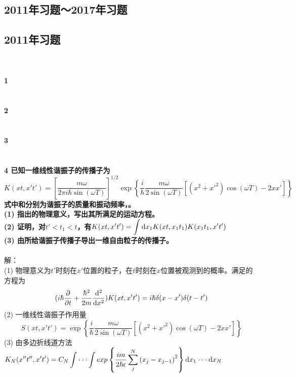 \documentclass[12pt]{article}
\numberwithin{equation}{section}	 %
\begin{document}
\begin{spacing}{1.5}
\newpage
\section{2011年习题～2017年习题}
\subsection{2011年习题}
~\\
~\\
\textbf{1 \quad }\\
~\\
~\\
\textbf{2 \quad }\\
~\\
~\\
\textbf{3 \quad }\\
~\\
~\\
\textbf{4 \quad 已知一维线性谐振子的传播子为
\begin{equation}\nonumber 		%
K(xt,x't') = \left[ \frac{m\omega}{2\pi i\hbar\sin(\omega T)} \right]^{1/2} \exp\left\{ \frac{i}{\hbar}\frac{m\omega}{2\sin(\omega T)} \left[ \left(x^{2}+x'^{2}\right)\cos(\omega T)-2xx' \right] \right\}
\end{equation}
式中和分别为谐振子的质量和振动频率，。\\
(1) 指出的物理意义，写出其所满足的运动方程。\\
(2) 证明，对$t'<t_{1}<t$，有$\displaystyle K(xt,x't') = \int\mathop{}\!\mathrm{d} x_{1}K(xt,x_{1}t_{1}) K(x_{1}t_{1},x't') $ \\
(3) 由所给谐振子传播子导出一维自由粒子的传播子。}\\
~\\
解：\\
(1) 物理意义为$t'$时刻在$x'$位置的粒子，在$t$时刻在$x$位置被观测到的概率。满足的方程为
\begin{equation}
(i\hbar\frac{\partial}{\partial t}+\frac{\hbar^{2}}{2m}\frac{\mathop{}\!\mathrm{d}^{2}}{\mathop{}\!\mathrm{d} x^{2}})K(xt,x't')=i\hbar\delta(x-x')\delta(t-t')
\end{equation}
(2) 一维线性谐振子作用量
\begin{equation}
S(xt,x't') = \exp\left\{ \frac{i}{\hbar}\frac{m\omega}{2\sin(\omega T)} \left[ \left(x^{2}+x'^{2}\right)\cos(\omega T)-2xx' \right] \right\}
\end{equation}
(3) 由多边折线道方法$\displaystyle K_{N}(x''t'',x't') = C_{N}\int \cdot\cdot\cdot \int exp\left\{\frac{im}{2\hbar\epsilon}\sum_{j}^{N}\left(x_{j}-x_{j-1}\right)^{2}\right\} \mathop{}\!\mathrm{d} x_{1} \cdot\cdot\cdot \mathop{}\!\mathrm{d} x_{N}$ \\

\end{spacing}
\end{document}
